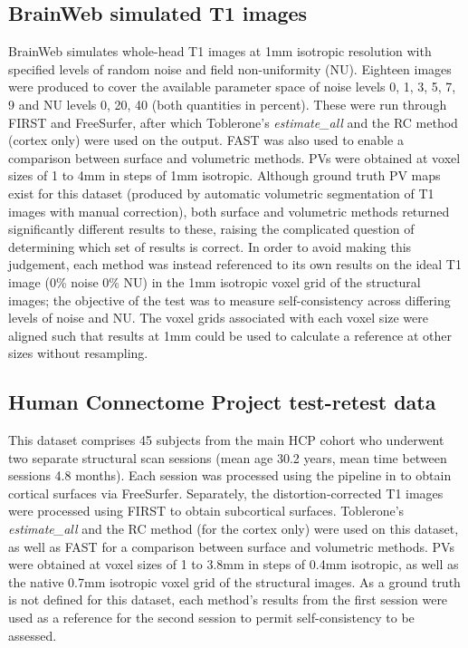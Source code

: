\subsection{BrainWeb simulated T1 images}
BrainWeb \cite{Collins1998, Cocosco1997} simulates whole-head T1 images at 1mm isotropic resolution with specified levels of random noise and field non-uniformity (NU).  Eighteen images were produced to cover the available parameter space of noise levels 0, 1, 3, 5, 7, 9 and NU levels 0, 20, 40 (both quantities in percent). These were run through FIRST and FreeSurfer, after which Toblerone’s \textit{estimate\_all} and the RC method (cortex only) were used on the output. FAST was also used to enable a comparison between surface and volumetric methods. PVs were obtained at voxel sizes of 1 to 4mm in steps of 1mm isotropic. Although ground truth PV maps exist for this dataset (produced by automatic volumetric segmentation of T1 images with manual correction), both surface and volumetric methods returned significantly different results to these, raising the complicated question of determining which set of results is correct. In order to avoid making this judgement, each method was instead referenced to its own results on the ideal T1 image (0\% noise 0\% NU) in the 1mm isotropic voxel grid of the structural images; the objective of the test was to measure self-consistency across differing levels of noise and NU. The voxel grids associated with each voxel size were aligned such that results at 1mm could be used to calculate a reference at other sizes without resampling. 

\subsection{Human Connectome Project test-retest data} 
This dataset comprises 45 subjects from the main HCP cohort who underwent two separate structural scan sessions (mean age 30.2 years, mean time between sessions 4.8 months). Each session was processed using the pipeline in \cite{Glasser2013} to obtain cortical surfaces via FreeSurfer. Separately, the distortion-corrected T1 images were processed using FIRST to obtain subcortical surfaces. Toblerone’s \textit{estimate\_all} and the RC method (for the cortex only) were used on this dataset, as well as FAST for a comparison between surface and volumetric methods. PVs were obtained at voxel sizes of 1 to 3.8mm in steps of 0.4mm isotropic, as well as the native 0.7mm isotropic voxel grid of the structural images. As a ground truth is not defined for this dataset, each method’s results from the first session were used as a reference for the second session to permit self-consistency to be assessed. 

